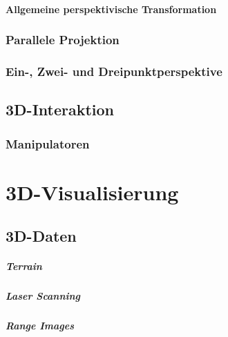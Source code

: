 \documentclass[a4paper, 11pt, accentcolor = tud3b]{tudreport}
\begin{document}
				\subsubsection{Allgemeine perspektivische Transformation} %

			\subsection{Parallele Projektion} %

			\subsection{Ein-, Zwei- und Dreipunktperspektive} %

		\section{3D-Interaktion} %

			\subsection{Manipulatoren} %

	\chapter{3D-Visualisierung} %

		\section{3D-Daten} %

			\paragraph{Terrain} %

			\paragraph{Laser Scanning} %

			\paragraph{Range Images} %
\end{document}
